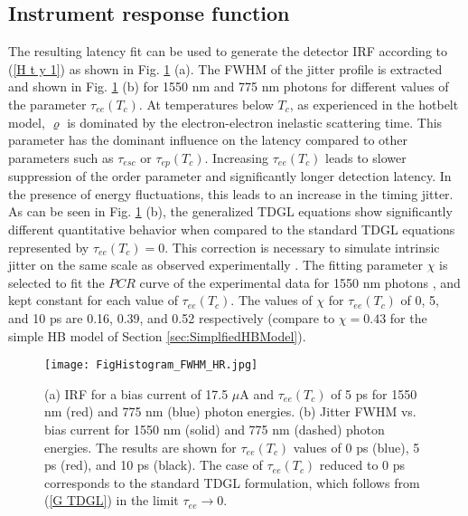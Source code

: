 \documentclass[%
reprint,
 amsmath,amssymb,
aps,
pra,
]{revtex4-1}
\begin{document}
\subsection{\label{sec:TDGLIRF}Instrument response function}
\quad The resulting latency fit can be used to generate the detector IRF according to (\ref{H t y 1}) as shown in Fig. \ref{F Hist FWHM} (a).  The FWHM of the jitter profile is extracted and shown in Fig. \ref{F Hist FWHM} (b) for 1550 nm and 775 nm photons for different values of the parameter \(\tau_{ee}\left(T_c\right) \).  At temperatures below \(T_c\), as experienced in the hotbelt model, \(\varrho\) is dominated by the electron-electron inelastic scattering time.  This parameter has the dominant influence on the latency compared to other parameters such as \(\tau_{esc}\) or \(\tau_{ep}\left(T_c\right) \).  Increasing \(\tau_{ee}\left(T_c\right) \) leads to slower suppression of the order parameter and significantly longer detection latency.  In the presence of energy fluctuations, this leads to an increase in the timing jitter.  As can be seen in Fig. \ref{F Hist FWHM} (b), the generalized TDGL equations show significantly different quantitative behavior when compared to the standard TDGL equations represented by \(\tau_{ee}\left(T_c\right) = 0\).  This correction is necessary to simulate intrinsic jitter on the same scale as observed experimentally \cite{korzh_demonstrating_2018}.  The fitting parameter \(\chi\) is selected to fit the $PCR$ curve of the experimental data for 1550 nm photons \cite{korzh_demonstrating_2018}, and kept constant for each value of \(\tau_{ee}\left(T_c\right) \).  The values of \(\chi \) for \(\tau_{ee}\left(T_c\right) \) of 0, 5, and 10 ps are 0.16, 0.39, and 0.52 respectively (compare to \(\chi=0.43 \) for the simple HB model of Section \ref{sec:SimplfiedHBModel}).
\begin{figure}
\texttt{[image: FigHistogram\_FWHM\_HR.jpg]}
\caption{(a) IRF for a bias current of 17.5 \(\mu\)A and \(\tau_{ee}\left(T_c\right) \) of 5 ps for 1550 nm (red) and 775 nm (blue) photon energies.  (b) Jitter FWHM vs. bias current for 1550 nm (solid) and 775 nm (dashed) photon energies.  The results are shown for \(\tau_{ee}\left(T_c\right) \) values of 0 ps (blue), 5 ps (red), and 10 ps (black).  The case of \(\tau_{ee}\left(T_c\right) \) reduced to 0 ps corresponds to the standard TDGL formulation, which follows from (\ref{G TDGL}) in the limit $\tau_{ee}\rightarrow0$. 
}
\label{F Hist FWHM}
\end{figure}
\end{document}
